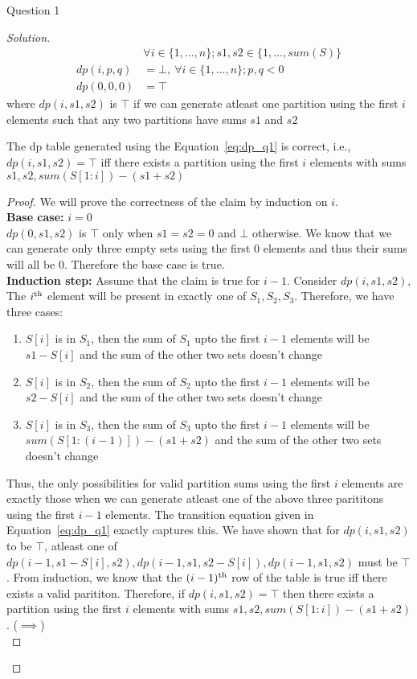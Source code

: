 \begin{solution}{Question 1}
\begin{proof}[Solution]
\begin{equation}
\begin{split}
                &\forall i\in \{1, \ldots, n\}; s1, s2\in\{1, \ldots, sum(S)\}\\
                dp(i, p, q) &= \bot,\ \forall i\in \{1, \ldots, n\}; p, q < 0\\
                dp(0, 0, 0) &= \top
            \end{split}
        \end{equation}
        where $dp(i, s1, s2)$ is $\top$ if we can generate atleast one partition using the first $i$ elements such that any two partitions have sums $s1$ and $s2$
        \begin{claim}
            The dp table generated using the Equation~\ref{eq:dp_q1} is correct, i.e., $dp(i, s1, s2)=\top$ iff there exists a partition using the first $i$ elements with sums $s1, s2, sum(S[1:i])-(s1+s2)$
        \end{claim}
        \begin{proof}
            We will prove the correctness of the claim by induction on $i$.\\
            \textbf{Base case:} $i=0$\\
            $dp(0, s1, s2)$ is $\top$ only when $s1=s2=0$ and $\bot$ otherwise. We know that we can generate only three empty sets using the first $0$ elements and thus their sums will all be $0$. Therefore the base case is true.\\
            \textbf{Induction step:} Assume that the claim is true for $i-1$. Consider $dp(i, s1, s2)$,\\
            The $i\textsuperscript{th}$ element will be present in exactly one of $S_1, S_2, S_3$. Therefore, we have three cases:
            \begin{enumerate}
                \item $S[i]$ is in $S_1$, then the sum of $S_1$ upto the first $i-1$ elements will be $s1-S[i]$ and the sum of the other two sets doesn't change
                \item $S[i]$ is in $S_2$, then the sum of $S_2$ upto the first $i-1$ elements will be $s2-S[i]$ and the sum of the other two sets doesn't change
                \item $S[i]$ is in $S_3$, then the sum of $S_3$ upto the first $i-1$ elements will be $sum(S[1:(i-1)])-(s1+s2)$ and the sum of the other two sets doesn't change
            \end{enumerate}
            Thus, the only possibilities for valid partition sums using the first $i$ elements are exactly those when we can generate atleast one of the above three parititons using the first $i-1$ elements. The transition equation given in Equation~\ref{eq:dp_q1} exactly captures this. We have shown that for $dp(i, s1, s2)$ to be $\top$, atleast one of $dp(i-1, s1-S[i], s2), dp(i-1, s1, s2-S[i]), dp(i-1, s1, s2)$ must be $\top$. From induction, we know that the
            $(i-1)\textsuperscript{th}$ row of the table is true iff there exists a valid parititon. Therefore, if $dp(i, s1, s2)=\top$ then there exists a partition using the first $i$ elements with sums $s1, s2, sum(S[1:i])-(s1+s2)$. ($\implies$)\\


\end{proof}
\end{proof}
\end{solution}
